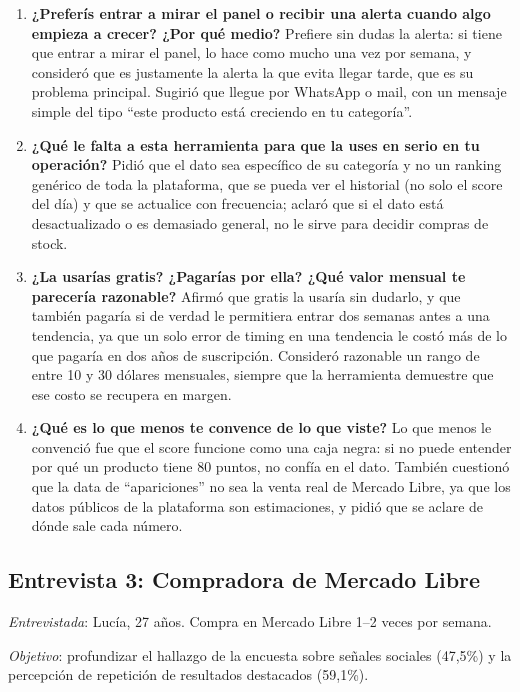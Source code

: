 \begin{enumerate}
	\item \textbf{¿Preferís entrar a mirar el panel o recibir una alerta cuando algo empieza a crecer? ¿Por qué medio?} Prefiere sin dudas la alerta: si tiene que entrar a mirar el panel, lo hace como mucho una vez por semana, y consideró que es justamente la alerta la que evita llegar tarde, que es su problema principal. Sugirió que llegue por WhatsApp o mail, con un mensaje simple del tipo ``este producto está creciendo en tu categoría''.
	\item \textbf{¿Qué le falta a esta herramienta para que la uses en serio en tu operación?} Pidió que el dato sea específico de su categoría y no un ranking genérico de toda la plataforma, que se pueda ver el historial (no solo el score del día) y que se actualice con frecuencia; aclaró que si el dato está desactualizado o es demasiado general, no le sirve para decidir compras de stock.
	\item \textbf{¿La usarías gratis? ¿Pagarías por ella? ¿Qué valor mensual te parecería razonable?} Afirmó que gratis la usaría sin dudarlo, y que también pagaría si de verdad le permitiera entrar dos semanas antes a una tendencia, ya que un solo error de timing en una tendencia le costó más de lo que pagaría en dos años de suscripción. Consideró razonable un rango de entre 10 y 30 dólares mensuales, siempre que la herramienta demuestre que ese costo se recupera en margen.
	\item \textbf{¿Qué es lo que menos te convence de lo que viste?} Lo que menos le convenció fue que el score funcione como una caja negra: si no puede entender por qué un producto tiene 80 puntos, no confía en el dato. También cuestionó que la data de ``apariciones'' no sea la venta real de Mercado Libre, ya que los datos públicos de la plataforma son estimaciones, y pidió que se aclare de dónde sale cada número.
\end{enumerate}

\subsection*{Entrevista 3: Compradora de Mercado Libre}

\emph{Entrevistada}: Lucía, 27 años. Compra en Mercado Libre 1--2 veces por semana.

\emph{Objetivo}: profundizar el hallazgo de la encuesta sobre señales sociales (47,5\%) y la percepción de repetición de resultados destacados (59,1\%).

